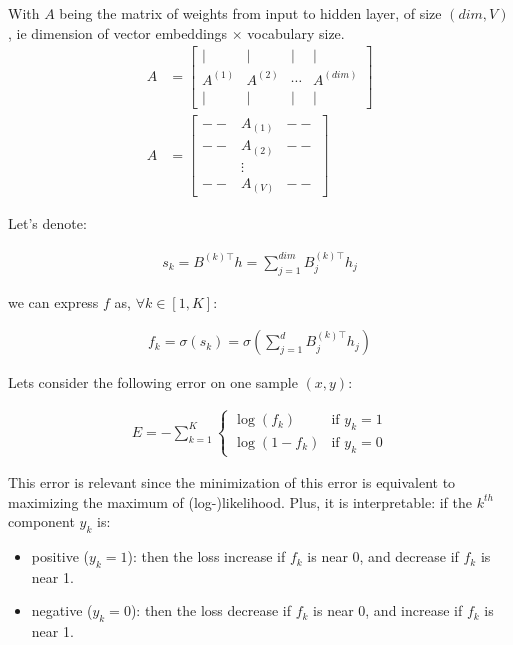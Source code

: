 With $A$ being the matrix of weights from input to hidden layer, of size $(\textit{dim}, V)$, ie dimension of vector embeddings $\times$ vocabulary size.
\begin{align}
	A &= \left[\begin{array}{cccc}| & | & | & | \\ A^{(1)} & A^{(2)} & \cdots & A^{(\textit{dim})} \\ | & | & | & | \end{array}\right]\\
	A &= \left[
		\begin{array}{cccc} 
		  	-- & A_{(1)} & -- \\
		  	-- & A_{(2)} & -- \\
		  	&\vdots 	\\
		  	-- & A_{(V)} & --
		\end{array}\right]
\end{align}



Let's denote:

\begin{align}
	s_k  = B^{(k)\top} h = \sum_{j=1}^{\textit{dim}} B^{(k)\top}_j h_j 
\end{align}

we can express $f$ as, $\forall k \in [1, K]$:

\begin{align}
	f_k  = \sigma(s_k) = \sigma( \sum_{j=1}^{d} B^{(k)\top}_j h_j) 
\end{align}

Lets consider the following error on one sample $(x, y)$:

\begin{align}
	E = - \sum_{k=1}^K
  			  	\left\{
				    \begin{array}{ll}
				        \log (f_k) & \mbox{if } y_k =1 \\
				        \log (1 - f_k) & \mbox{if } y_k =0
				    \end{array}
				\right.
\end{align}

This error is relevant since the minimization of this error is equivalent to maximizing the maximum of (log-)likelihood.
Plus, it is interpretable: if the $k^{th}$ component $y_k$ is:
\begin{itemize}
	\item positive ($y_k=1$): then the loss increase if $f_k$ is near 0, and decrease if $f_k$ is near 1.
	\item negative ($y_k=0$): then the loss decrease if $f_k$ is near 0, and increase if $f_k$ is near 1.
\end{itemize}




